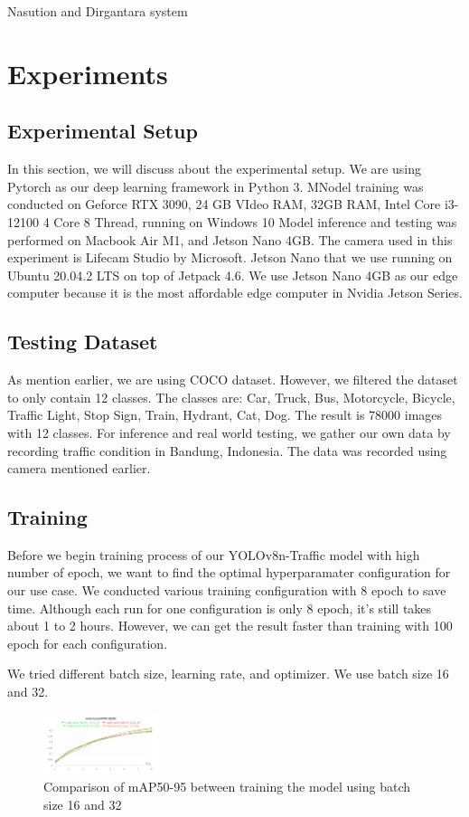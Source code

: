 \documentclass[conference]{IEEEtran}
\begin{document}
Nasution and Dirgantara system
\section{Experiments}


\subsection{Experimental Setup}
In this section, we will discuss about the experimental setup. We are using Pytorch as our deep learning framework in Python  3.
MNodel training was conducted on Geforce RTX 3090, 24 GB VIdeo RAM, 32GB RAM, Intel Core i3-12100 4 Core 8 Thread, running on Windows 10
Model inference and testing was performed on Macbook Air M1, and Jetson Nano 4GB. The camera used in this experiment is Lifecam Studio by Microsoft.
Jetson Nano that we use running on Ubuntu 20.04.2 LTS on top of Jetpack 4.6. We use Jetson Nano 4GB as our edge computer because it is the most affordable edge computer in Nvidia Jetson Series.
\subsection{Testing Dataset}
As mention earlier, we are using COCO dataset. However, we filtered the dataset to only contain 12 classes. The classes are:
Car, Truck, Bus, Motorcycle, Bicycle, Traffic Light, Stop Sign, Train, Hydrant, Cat, Dog. The result is 78000 images with 12 classes.
For inference and real world testing, we gather our own data by recording traffic condition in Bandung, Indonesia. The data was recorded using camera mentioned earlier.

\subsection{Training}
Before we begin training process of our YOLOv8n-Traffic model with high number of epoch, we want to find the optimal hyperparamater configuration for our use case. We conducted various training configuration with 8 epoch to save time.
Although each run for one configuration is only 8 epoch, it's still takes about 1 to 2 hours. However, we can get the result faster than training with 100 epoch for each configuration.

We tried different batch size, learning rate, and optimizer. We use batch size 16 and 32.
\begin{figure}[h]
\centering
\includegraphics[width=0.3\textwidth,keepaspectratio]{mAP_batch_size_comparison.png} %
\caption{Comparison of mAP50-95 between training the model using batch size 16 and 32}
\label{fig:batch_size}
\end{figure}
\end{document}
